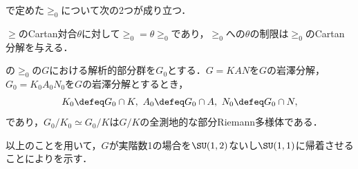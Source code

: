 で定めた$\ge_0$について次の2つが成り立つ．
\begin{lem}\cite[p.~409, Lemma~2.2]{hel01}
  $\ge$のCartan対合$\theta$に対して$\ge_0 = \theta\ge_0$であり，$\ge_0 $への$\theta$の制限は$\ge_0$のCartan分解を与える．
\end{lem}


\begin{lem}\cite[p.~409, Lemma~2.3]{hel01}

  の$\ge_0$の$G$における解析的部分群を$G_0$とする．$G = KAN$を$G$の岩澤分解，$G_0 = K_0A_0N_0$を$G$の岩澤分解とするとき，
  \begin{align*}
    K_0\defeq G_0\cap K,\ A_0 \defeq G_0\cap A,\ N_0\defeq G_0\cap N, 
  \end{align*}
  であり，$G_0/K_0 \simeq G_0/K$は$G/K$の全測地的な部分Riemann多様体である．
  
\end{lem}

以上のことを用いて，$G$が実階数1の場合を$\SU(1,2) $ないし$\SU(1,1) $に帰着させることによりを示す．

